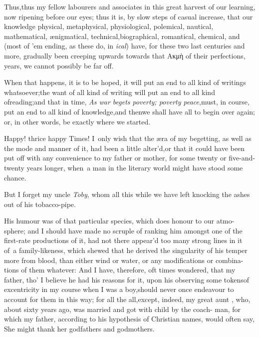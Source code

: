 \documentclass[twoside]{article}
\begin{document}
Thus,\tsk thus my fellow labourers and associates in this great harvest of
our
learning, now ripening before our eyes; thus it is, by slow steps of casual
increase, that our knowledge physical, metaphy\-sical, physiological, polemical,
nautical, mathematical, ænigmatical, technical,\break biographical, romantical,
chemical, and 
\break
(most of ’em ending, as these do, in \textit{ical}) have, for these two last
centuries and more, gradually been creeping upwards towards that Ακμὴ of their
perfections,\break 
{} 
years, we cannot possibly be far off.

When that happens, it is to be hoped, it will put an end to all
kind of writings whatsoever;\tsk the want of all kind of writing
will put an end to all kind of\break reading;\tsk and that in time,
\textit{As war be\-gets poverty; poverty peace},\tsh must, in
course, put an end to all kind of know\-ledge,\tsk and
then\tsh we shall have all to begin over again; or, in
other words, be exactly where we started.

\tsh Happy! thrice happy Times! I~only wish that the æra of my begetting, as well
as the mode and manner of it, had been a little alter’d,\tsk or that it could have
been put off with any convenience to my father or mother, for some twenty or
five-and-twenty years longer, when~a man in the literary world might have\break
stood some chance.\tsh 

But I forget my uncle \textit{Toby}, whom all\break
this while we have left knocking the\break
ashes out of his tobacco-pipe.

His humour was of that particular\break
species, which does honour to our atmo-
sphere; and I should have made no scruple of ranking him
amongst one of the first-rate productions of it, had not there
appear’d too many strong lines in it of~a family-likeness, which
shewed that he derived the singularity of his temper\break
more from blood, than either wind or\break 
water, or any modifications or combina-\break
tions of them whatever: And I have, therefore, oft times
wondered, that my father, tho’ I believe he had his reasons
for it, upon his observing some tokens\break of excentricity in my
course when I was a boy,\tsk should never once endeavour to
account for them in this way; for all the\break
{}
all,\tsk except, indeed, my great aunt , 
who, about sixty years ago, was 
married and got with child by the coach-
man, for which my father, according to his hypothesis of Christian
names, would often say, She might thank her godfathers and
godmothers.
\end{document}
